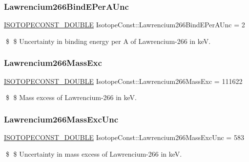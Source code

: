 \subsubsection{\texorpdfstring{Lawrencium266\+Bind\+E\+Per\+A\+Unc}{Lawrencium266BindEPerAUnc}}
{\footnotesize\ttfamily \mbox{\hyperlink{group___isotope_const-_macros_ga8f45a7272ce02c0b4c65c44636ed719a}{I\+S\+O\+T\+O\+P\+E\+C\+O\+N\+S\+T\+\_\+\+D\+O\+U\+B\+LE}} Isotope\+Const\+::\+Lawrencium266\+Bind\+E\+Per\+A\+Unc = 2}

\$ \$ Uncertainty in binding energy per A of Lawrencium-\/266 in keV. \mbox{\label{group___isotope_const-_lawrencium-_lr266_ga39fbc394ea7240a71cf1c0f6aadb5c0a}} 
\subsubsection{\texorpdfstring{Lawrencium266\+Mass\+Exc}{Lawrencium266MassExc}}
{\footnotesize\ttfamily \mbox{\hyperlink{group___isotope_const-_macros_ga8f45a7272ce02c0b4c65c44636ed719a}{I\+S\+O\+T\+O\+P\+E\+C\+O\+N\+S\+T\+\_\+\+D\+O\+U\+B\+LE}} Isotope\+Const\+::\+Lawrencium266\+Mass\+Exc = 111622}

\$ \$ Mass excess of Lawrencium-\/266 in keV. \mbox{\label{group___isotope_const-_lawrencium-_lr266_ga693f146392011fd043065dc37195b46d}} 
\subsubsection{\texorpdfstring{Lawrencium266\+Mass\+Exc\+Unc}{Lawrencium266MassExcUnc}}
{\footnotesize\ttfamily \mbox{\hyperlink{group___isotope_const-_macros_ga8f45a7272ce02c0b4c65c44636ed719a}{I\+S\+O\+T\+O\+P\+E\+C\+O\+N\+S\+T\+\_\+\+D\+O\+U\+B\+LE}} Isotope\+Const\+::\+Lawrencium266\+Mass\+Exc\+Unc = 583}

\$ \$ Uncertainty in mass excess of Lawrencium-\/266 in keV. \mbox{\label{group___isotope_const-_lawrencium-_lr266_gafdfaa5a2ad200c701c766db65876ff62}} 
